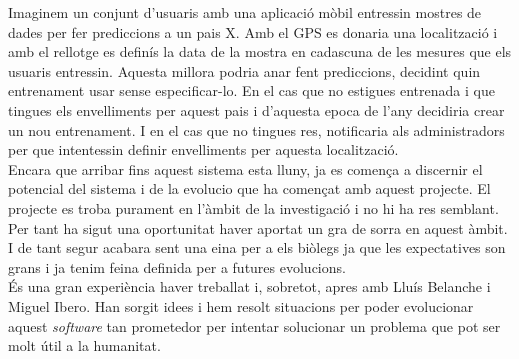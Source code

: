 Imaginem un conjunt d'usuaris amb una aplicació mòbil entressin mostres de dades per fer prediccions a un pais X. Amb el GPS es donaria una localització i amb el rellotge es definís la data de la mostra en cadascuna de les mesures que els usuaris entressin. Aquesta millora podria anar fent prediccions, decidint quin entrenament usar sense especificar-lo. En el cas que no estigues entrenada i que tingues els envelliments per aquest pais i d'aquesta epoca de l'any decidiria crear un nou entrenament. I en el cas que no tingues res, notificaria als administradors per que intentessin definir envelliments per aquesta localització.\\

Encara que arribar fins aquest sistema esta lluny, ja es comença a discernir el potencial del sistema i de la evolucio que ha començat amb aquest projecte. El projecte es troba purament en l'àmbit de la investigació i no hi ha res semblant. Per tant ha sigut una oportunitat haver aportat un gra de sorra en aquest àmbit. I de tant segur acabara sent una eina per a els biòlegs ja que les expectatives son grans i ja tenim feina definida per a futures evolucions.\\

\'{E}s una gran experiència haver treballat i, sobretot, apres amb Lluís Belanche i Miguel Ibero. Han sorgit idees i hem resolt situacions per poder evolucionar aquest \textit{software} tan prometedor per intentar solucionar un problema que pot ser molt útil a la humanitat.
